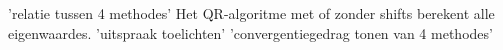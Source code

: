 'relatie tussen 4 methodes'
Het QR-algoritme met of zonder shifts berekent alle eigenwaardes. 
'uitspraak toelichten'
'convergentiegedrag tonen van 4 methodes'